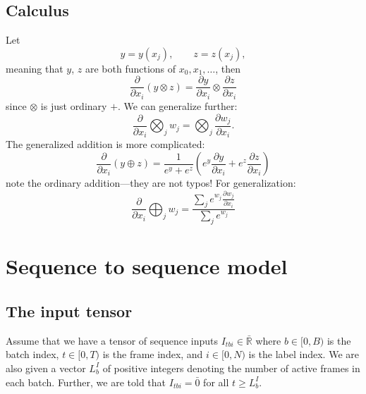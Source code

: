 \documentclass[a4paper]{article}
\begin{document}

\subsection{Calculus}

Let
\begin{equation}
y = y(x_j), \qquad z = z(x_j),
\end{equation}
meaning that $y$, $z$ are both functions of $x_0, x_1, \ldots$, then
\begin{equation}
\frac{\partial}{\partial x_i}(y \otimes z) = \frac{\partial y}{\partial x_i}\otimes\frac{\partial z}{\partial x_i}
\end{equation}
since $\otimes$ is just ordinary $+$. We can generalize further:
\begin{equation}
\frac{\partial}{\partial x_i}\bigotimes_j w_j = \bigotimes_j \frac{\partial w_j}{\partial x_i}.
\end{equation}
The generalized addition is more complicated:
\begin{equation}
\frac{\partial}{\partial x_i}(y\oplus z) = \frac{1}{e^y+e^z}\left(e^y \frac{\partial y}{\partial x_i} + e^z \frac{\partial z}{\partial x_i}\right)
\end{equation}
note the ordinary addition---they are not typos! For generalization:
\begin{equation}
\frac{\partial}{\partial x_i}\bigoplus_j w_j = \frac{\sum_j e^{w_j}\frac{\partial w_j}{\partial x_i}}{\sum_j e^{w_j}}
\end{equation}


\section{Sequence to sequence model}

\subsection{The input tensor}

Assume that we have a tensor of sequence inputs $I_{tbi} \in \bar{\mathbb{R}}$ where $b \in [0, B)$ is the batch index, $t \in [0, T)$ is the frame index, and $i \in [0, N)$ is the label index. We are also given a vector $L^I_b$ of positive integers denoting the number of active frames in each batch. Further, we are told that $I_{tbi} = \bar{0}$ for all $t \geq L^I_b$.
\end{document}
